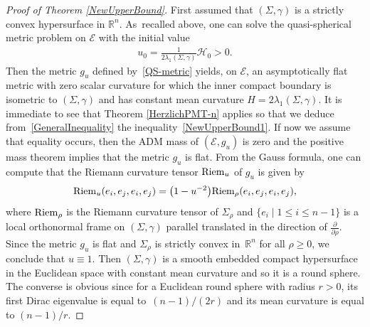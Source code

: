 \documentclass[10pt,a4paper]{amsart}
\numberwithin{equation}{section}
\begin{document}
\begin{proof}[Proof of Theorem \ref{NewUpperBound}]
First assumed that $(\Sigma,\gamma)$ is a strictly convex hypersurface in $\mathbb{R}^n$. As~recalled above, one can solve the quasi-spherical metric problem on $\mathcal{E}$ with the initial value
\begin{gather*}%
u_0=\frac{1}{2\lambda_1(\Sigma,\gamma)}\mathcal{H}_0>0.
\end{gather*}
Then the metric $g_u$ defined by~\eqref{QS-metric} yields, on $\mathcal{E}$, an asymptotically flat metric with zero scalar curvature for which the inner compact boundary is isometric to $(\Sigma,\gamma)$ and has constant mean curvature $H=2\lambda_1(\Sigma,\gamma)$. It is immediate to see that Theorem \ref{HerzlichPMT-n} applies so that we deduce from~\eqref{GeneralInequality} the inequality~\eqref{NewUpperBound1}. If now we assume that equality occurs, then the ADM mass of $(\mathcal{E},g_u)$ is zero and the positive mass theorem implies that the metric $g_u$ is flat. From the Gauss formula, one can compute that the Riemann curvature tensor ${\rm Riem}_u$ of $g_u$ is given by
\begin{gather*}%
{\rm Riem}_u(e_i,e_j,e_i,e_j)=\big(1-u^{-2}\big){\rm Riem}_\rho(e_i,e_j,e_i,e_j),
\end{gather*}
where ${\rm Riem}_\rho$ is the Riemann curvature tensor of $\Sigma_\rho$ and $\{e_i\mid 1\leq i\leq n-1\}$ is a local orthonormal frame on $(\Sigma,\gamma)$ parallel translated in the direction of $\frac{\partial}{\partial \rho}$. Since the metric $g_u$ is flat and $\Sigma_\rho$ is strictly convex in~$\mathbb{R}^n$ for all $\rho\geq0$, we conclude that $u\equiv 1$. Then $(\Sigma,\gamma)$ is a smooth embedded compact hypersurface in the Euclidean space with constant mean curvature and so it is a round sphere. The converse is obvious since for a Euclidean round sphere with radius $r>0$, its first Dirac eigenvalue is equal to~$(n-1)/(2r)$ and its mean curvature is equal to $(n-1)/r$.


\end{proof}
\end{document}
